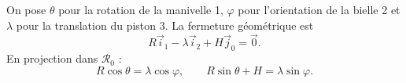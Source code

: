 \begin{corrigebox}
On pose $\theta$ pour la rotation de la manivelle 1, $\varphi$ pour
l'orientation de la bielle 2 et $\lambda$ pour la translation du piston 3.
La fermeture géométrique est
\[R\vec i_1-\lambda\vec i_2+H\vec j_0=\vec0.\]
En projection dans $\mathcal R_0$ :
\[
R\cos\theta=\lambda\cos\varphi,\qquad
R\sin\theta+H=\lambda\sin\varphi.
\]
\end{corrigebox}
